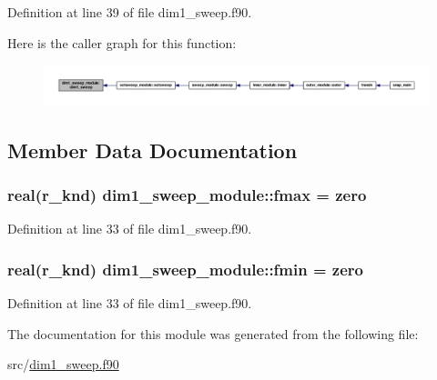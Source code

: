 Definition at line 39 of file dim1\-\_\-sweep.\-f90.



Here is the caller graph for this function\-:\nopagebreak
\begin{figure}[H]
\begin{center}
\leavevmode
\includegraphics[width=350pt]{classdim1__sweep__module_aa0a270b2504bf7da636d3b3eaecdea16_icgraph}
\end{center}
\end{figure}




\subsection{Member Data Documentation}
\hypertarget{classdim1__sweep__module_a973f03dda9d8fe7662d437c0c790f3a2}{
\subsubsection[{fmax}]{\setlength{\rightskip}{0pt plus 5cm}real(r\-\_\-knd) dim1\-\_\-sweep\-\_\-module\-::fmax = zero}}\label{classdim1__sweep__module_a973f03dda9d8fe7662d437c0c790f3a2}


Definition at line 33 of file dim1\-\_\-sweep.\-f90.

\hypertarget{classdim1__sweep__module_a9b0ce6702181b5c9bf98ac179929a1aa}{
\subsubsection[{fmin}]{\setlength{\rightskip}{0pt plus 5cm}real(r\-\_\-knd) dim1\-\_\-sweep\-\_\-module\-::fmin = zero}}\label{classdim1__sweep__module_a9b0ce6702181b5c9bf98ac179929a1aa}


Definition at line 33 of file dim1\-\_\-sweep.\-f90.



The documentation for this module was generated from the following file\-:\begin{DoxyCompactItemize}
\item 
src/\hyperlink{dim1__sweep_8f90}{dim1\-\_\-sweep.\-f90}\end{DoxyCompactItemize}
